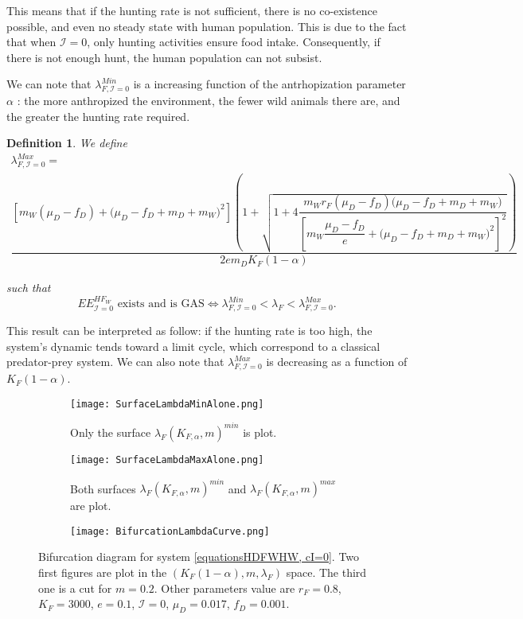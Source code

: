 \documentclass{article}
\newcommand{\lfw}{\lambda_{F}}
\newcommand{\lfw}{\lambda_{F}}
\newcommand{\Kfa}{K_{F,\alpha}}
\newcommand{\cI}{\mathcal{I}}
\newtheorem{definition}{Definition}
\begin{document}
This means that if the hunting rate is not sufficient, there is no co-existence possible, and even no steady state with human population. This is due to the fact that when $\cI = 0$, only hunting activities ensure food intake. Consequently, if there is not enough hunt, the human population can not subsist.

We can note that $\lambda_{F, \cI=0}^{Min}$ is a increasing function of the antrhopization parameter $\alpha$ : the more anthropized the environment, the fewer wild animals there are, and the greater the hunting rate required. 

\begin{definition}
We define
\begin{multline*}
\lambda_{F, \cI =0}^{Max}  = \\
 \dfrac{\left[m_{W}(\mu_{D}-f_{D})+\big(\mu_{D}-f_{D}+m_{D}+m_{W})^{2}\right]\left(1+\sqrt{1+4\dfrac{m_{W}r_{F}\left(\mu_{D}-f_{D}\right)\big(\mu_{D}-f_{D}+m_{D}+m_{W})}{\left[m_{W}\dfrac{\mu_{D}-f_{D}}{e}+\big(\mu_{D}-f_{D}+m_{D}+m_{W})^{2}\right]^{2}}}\right)}{2em_D K_F(1- \alpha)}
\end{multline*}

such that $$
\text{$EE^{HF_W}_{\cI = 0}$ exists and is GAS} \Leftrightarrow \lambda_{F, \cI=0}^{Min} < \lfw < \lambda_{F, \cI =0}^{Max}
.$$
\end{definition}

This result can be interpreted as follow: if the hunting rate is too high, the system's dynamic tends toward a limit cycle, which correspond to a classical predator-prey system. We can also note that $\lambda_{F, \cI =0}^{Max} $ is decreasing as a function of $K_F(1-\alpha)$. 

\begin{figure}
\centering
\begin{subfigure}{0.49\textwidth}
\centering
\texttt{[image: SurfaceLambdaMinAlone.png]}
\caption{Only the surface $\lfw(\Kfa, m)^{min}$ is plot.}
\end{subfigure}
\begin{subfigure}{0.49\textwidth}
\centering
\texttt{[image: SurfaceLambdaMaxAlone.png]}
\caption{Both surfaces $\lfw(\Kfa, m)^{min}$ and $\lfw(\Kfa, m)^{max}$ are plot.}
\end{subfigure}
\hfill
\begin{subfigure}{\textwidth}
\texttt{[image: BifurcationLambdaCurve.png]}
\caption{}
\end{subfigure}
\caption{\centering Bifurcation diagram for system \eqref{equationsHDFWHW, cI=0}. Two first figures are plot in the $(K_F(1-\alpha), m, \lfw)$ space. The third one is a cut for $m=0.2$. Other parameters value are $r_F = 0.8$, $K_F=3000$, $e=0.1$, $\cI=0$, $\mu_D = 0.017$, $f_D = 0.001$.}
\end{figure}
\end{document}
